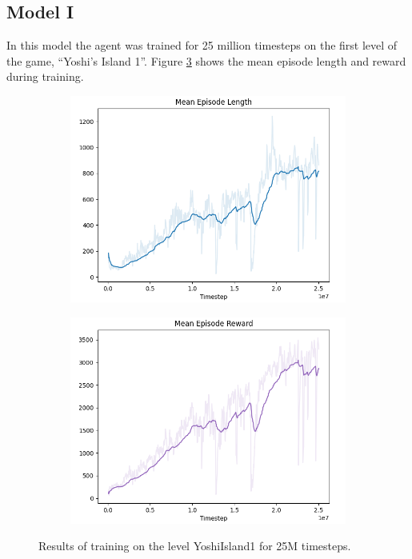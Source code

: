 \documentclass[a4paper]{article}
\begin{document}
\subsection{Model I}
In this model the agent was trained for 25 million timesteps on the first level of the game, ``Yoshi's Island 1''.
Figure \ref{fig:result1} shows the mean episode length and reward during training.
\begin{figure}[htbp]
    \centering
    \begin{subfigure}{.45\textwidth}
        \centering
        \includegraphics[width=\textwidth]{PPO_YoshiIsland1_len}
        \label{fig:result1:sub1}
    \end{subfigure}%
    \begin{subfigure}{.45\textwidth}
        \centering
        \includegraphics[width=\textwidth]{PPO_YoshiIsland1_rew}
        \label{fig:result1:sub2}
    \end{subfigure}
    \caption{Results of training on the level YoshiIsland1 for 25M timesteps.}
    \label{fig:result1}
\end{figure}
\end{document}
